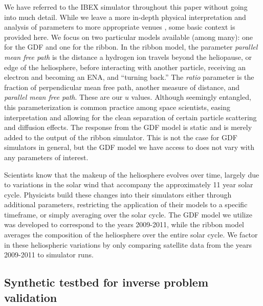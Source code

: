 \documentclass[11pt]{article}
\begin{document}
We have referred to the IBEX simulator throughout this paper without going
into much detail. While we leave a more in-depth physical interpretation and
analysis of parameters to more appropriate venues
\citep{zirnstein2021heliosheath,zirnstein2025global,swaczyna2020density,huang2025numerical},
some basic context is provided here. We focus on two particular models
available (among many): one for the GDF and one for the ribbon. In the ribbon
model, the parameter \textit{parallel mean free path} is the distance a
hydrogen ion travels beyond the heliopause, or edge of the heliosphere, before
interacting with another particle, receiving an electron and becoming an ENA,
and ``turning back.'' The \textit{ratio} parameter is the fraction of
perpendicular mean free path, another measure of distance, and
\textit{parallel mean free path}. These are our $u$ values.
{\color{red}Although seemingly entangled, this parameterization is common
practice among space scientists, easing interpretation and allowing for the
clean separation of certain particle scattering and diffusion effects.} The
response from the GDF model is static and is merely added to the output of the
ribbon simulator. This is not the case for GDF simulators in general, but the
GDF model we have access to does not vary with any parameters of interest.

Scientists know that the makeup of the heliosphere evolves over time, largely
due to variations in the solar wind that accompany the approximately 11 year
solar cycle. Physicists build these changes into their simulators either through
additional parameters, restricting the application of their models to a specific
timeframe, or simply averaging over the solar cycle. The GDF model we utilize
was developed to correspond to the years 2009-2011, while the ribbon model
averages the composition of the heliosphere over the entire solar cycle. We
factor in these heliospheric variations by only comparing satellite data from
the years 2009-2011 to simulator runs.

\subsection{Synthetic testbed for inverse problem validation}
\label{sec:synth_data}
\end{document}
